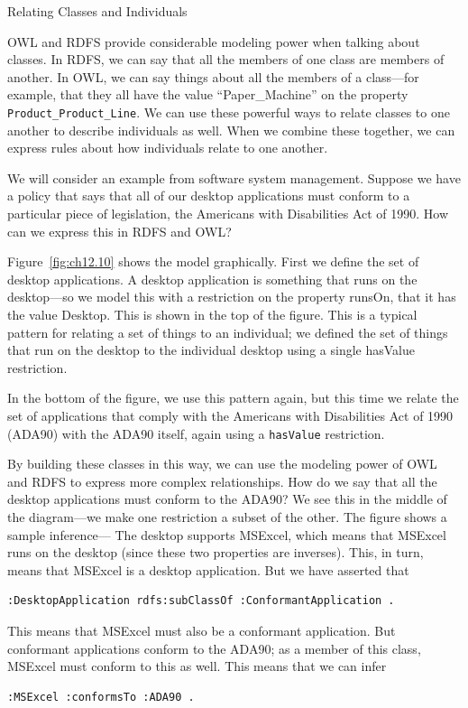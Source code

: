 \begin{challenge}{Relating Classes and Individuals}
\label{chal:25}

OWL and RDFS provide considerable modeling power when talking about
classes. In RDFS, we can say that all the members of one class are
members of another. In OWL, we can say things about all the members of a
class---for example, that they all have the value ``Paper\_Machine'' on
the property \texttt{Product\_Product\_Line}. We can use these powerful ways to
relate classes to one another to describe individuals as well. When we
combine these together, we can express rules about how individuals
relate to one another.

We will consider an example from software system management. Suppose we
have a policy that says that all of our desktop applications must
conform to a particular piece of legislation, the Americans with
Disabilities Act of 
1990. How can we express this in RDFS and OWL?

Figure~\ref{fig:ch12.10} shows the model graphically. First we define the set of
desktop applications. A desktop application is something that runs on
the desktop---so we model this with a restriction on the property
runsOn, that it has the value Desktop. This is shown in the top of the
figure. This is a typical pattern for relating a set of things to an
individual; we defined the set of things that run on the desktop to the
individual desktop using a single hasValue restriction.

In the bottom of the figure, we use this pattern again, but this time we
relate the set of applications that comply
with the Americans with Disabilities Act of 1990 (ADA90) with the ADA90
itself, again using a \texttt{hasValue}
restriction.

By building these classes in this way, we can use the modeling power of
OWL and RDFS to express more complex relationships. How do we say that
all the desktop applications must conform to the ADA90? We see this in
the middle of the diagram---we make one restriction a subset of the
other. The figure shows a sample inference--- The desktop supports
MSExcel, which means that MSExcel runs on the desktop (since these two
properties are inverses). This, in turn, means that MSExcel is a desktop
application. But we have asserted that

\begin{lstlisting}
:DesktopApplication rdfs:subClassOf :ConformantApplication .
\end{lstlisting}

This means that MSExcel must also be a conformant application. But
conformant applications conform to the
ADA90; as a member of this class, MSExcel must conform to this as well.
This means that we can infer

\begin{lstlisting}
:MSExcel :conformsTo :ADA90 .
\end{lstlisting}
\end{challenge}

